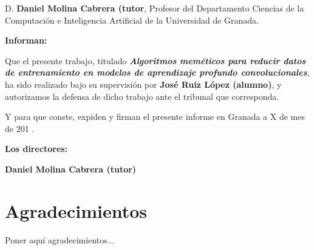 D. \textbf{Daniel Molina Cabrera (tutor}, Profesor del Departamento Ciencias de la Computación e Inteligencia
Artificial de la Universidad de Granada.

\vspace{0.5cm}

\textbf{Informan:}

\vspace{0.5cm}

Que el presente trabajo, titulado \textit{\textbf{Algoritmos meméticos para reducir datos de entrenamiento en modelos
de aprendizaje profundo convolucionales}},
ha sido realizado bajo su supervisión por \textbf{José Ruiz López (alumno)}, y autorizamos la defensa de dicho trabajo
ante el tribunal que corresponda.

\vspace{0.5cm}

Y para que conste, expiden y firman el presente informe en Granada a X de mes de 201 .

\vspace{1cm}

\textbf{Los directores:}

\vspace{5cm}

\noindent \textbf{Daniel Molina Cabrera (tutor)}

\chapter*{Agradecimientos}
\thispagestyle{empty}

       \vspace{1cm}


Poner aquí agradecimientos...

